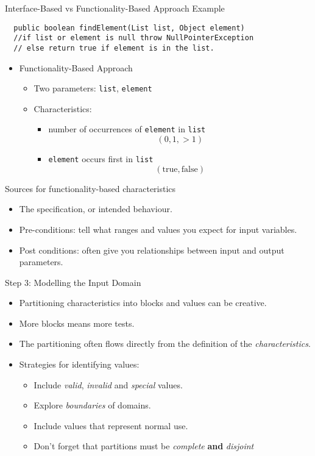 \documentclass{beamer}
\begin{document}
\begin{frame}[fragile]
{Interface-Based vs Functionality-Based Approach Example}
\begin{verbatim}
  public boolean findElement(List list, Object element)
  //if list or element is null throw NullPointerException
  // else return true if element is in the list.
\end{verbatim}
\begin{itemize}
  \item Functionality-Based Approach
   \begin{itemize}
     \item Two parameters: {\tt list}, {\tt element}
     \item Characteristics:
      \begin{itemize}
        \item number of occurrences of {\tt element} in {\tt list}
          \[ (0,1,>1)\]
        \item {\tt element} occurs first in {\tt list}
        \[ (\mathrm{true},\mathrm{false}) \]
      \end{itemize}
    \end{itemize}
%
\end{itemize}
%
\end{frame}
\begin{frame}{Sources for functionality-based characteristics}
  \begin{itemize}
  \item The specification, or intended behaviour.
  \item Pre-conditions: tell what ranges and values you expect for
    input variables.
  \item Post conditions: often give you relationships between input
    and output parameters. 
  \end{itemize}
  

\end{frame}
\begin{frame}{Step 3: Modelling the Input Domain}
  \begin{itemize}
  \item Partitioning characteristics into blocks and values can be
    creative.
  \item More blocks means more tests.
  \item The partitioning often flows directly from the definition of
    the {\em characteristics}.
  \item Strategies for identifying values:
    \begin{itemize}
    \item Include {\em valid}, {\em invalid} and {\em special} values.
    \item Explore {\em boundaries} of domains.
    \item Include values that represent normal use.
    \item Don't forget that partitions must  be {\em complete} {\bf and} {\em disjoint}
    \end{itemize}
  \end{itemize}  
\end{frame}
\end{document}
